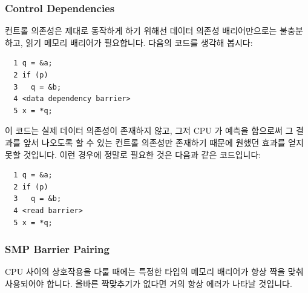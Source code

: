\begin{enumerate}
\subsubsection{Control Dependencies}
\label{sec:advsync:Control Dependencies}

컨트롤 의존성은 제대로 동작하게 하기 위해선 데이터 의존성 배리어만으로는
불충분하고, 읽기 메모리 배리어가 필요합니다.  다음의 코드를 생각해 봅시다:

\vspace{5pt}
\begin{minipage}[t]{\columnwidth}
\scriptsize
\begin{verbatim}
  1 q = &a;
  2 if (p)
  3   q = &b;
  4 <data dependency barrier>
  5 x = *q;
\end{verbatim}
\end{minipage}
\vspace{5pt}

이 코드는 실제 데이터 의존성이 존재하지 않고, 그저 CPU 가 예측을 함으로써 그
결과를 앞서 나오도록 할 수 있는 컨트롤 의존성만 존재하기 때문에 원했던 효과를
얻지 못할 것입니다.
이런 경우에 정말로 필요한 것은 다음과 같은 코드입니다:

\vspace{5pt}
\begin{minipage}[t]{\columnwidth}
\scriptsize
\begin{verbatim}
  1 q = &a;
  2 if (p)
  3   q = &b;
  4 <read barrier>
  5 x = *q;
\end{verbatim}
\end{minipage}
\vspace{5pt}

\subsubsection{SMP Barrier Pairing}
\label{sec:advsync:SMP Barrier Pairing}

CPU 사이의 상호작용을 다룰 때에는 특정한 타입의 메모리 배리어가 항상 짝을 맞춰
사용되어야 합니다.
올바른 짝맞추기가 없다면 거의 항상 에러가 나타날 것입니다.


\end{enumerate}
